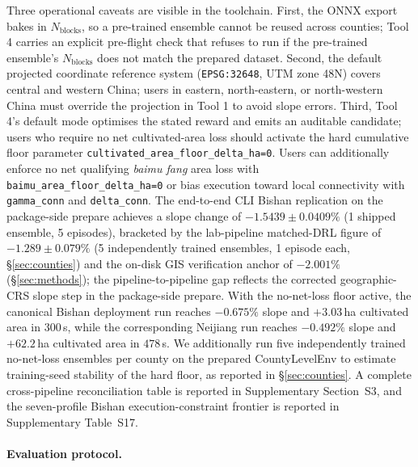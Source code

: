\documentclass[11pt]{article}
\begin{document}
Three operational caveats are visible in the toolchain. First, the ONNX export bakes in $N_{\text{blocks}}$, so a pre-trained ensemble cannot be reused across counties; Tool 4 carries an explicit pre-flight check that refuses to run if the pre-trained ensemble's $N_{\text{blocks}}$ does not match the prepared dataset. Second, the default projected coordinate reference system (\texttt{EPSG:32648}, UTM zone 48N) covers central and western China; users in eastern, north-eastern, or north-western China must override the projection in Tool 1 to avoid slope errors. Third, Tool 4's default mode optimises the stated reward and emits an auditable candidate; users who require no net cultivated-area loss should activate the hard cumulative floor parameter \texttt{cultivated\_area\_floor\_delta\_ha=0}. Users can additionally enforce no net qualifying \textit{baimu fang} area loss with \texttt{baimu\_area\_floor\_delta\_ha=0} or bias execution toward local connectivity with \texttt{gamma\_conn} and \texttt{delta\_conn}. The end-to-end CLI Bishan replication on the package-side prepare achieves a slope change of $-1.5439 \pm 0.0409\%$ (1 shipped ensemble, 5 episodes), bracketed by the lab-pipeline matched-DRL figure of $-1.289 \pm 0.079\%$ (5 independently trained ensembles, 1 episode each, \S\ref{sec:counties}) and the on-disk GIS verification anchor of $-2.001\%$ (\S\ref{sec:methods}); the pipeline-to-pipeline gap reflects the corrected geographic-CRS slope step in the package-side prepare. With the no-net-loss floor active, the canonical Bishan deployment run reaches $-0.675\%$ slope and $+3.03$\,ha cultivated area in $300$\,s, while the corresponding Neijiang run reaches $-0.492\%$ slope and $+62.2$\,ha cultivated area in $478$\,s. We additionally run five independently trained no-net-loss ensembles per county on the prepared CountyLevelEnv to estimate training-seed stability of the hard floor, as reported in \S\ref{sec:counties}. A complete cross-pipeline reconciliation table is reported in Supplementary Section~S3, and the seven-profile Bishan execution-constraint frontier is reported in Supplementary Table~S17.

\paragraph{Evaluation protocol.}
\end{document}
